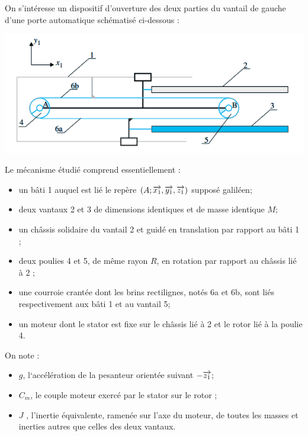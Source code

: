 \documentclass[10pt,fleqn]{article} %
\begin{document}
\def\pathfig{images}

\vspace{4.5cm}
\pagestyle{fancy}
\thispagestyle{plain}

\def\columnseprulecolor{\color{ocre}}
\setlength{\columnseprule}{0.4pt} 

\def\pathfig{images}

\ifprof
\else
\begin{multicols}{2}
\fi

On s’intéresse un dispositif d’ouverture des deux parties du vantail de gauche d’une porte automatique
schématisé ci-dessous :

\begin{center}
\includegraphics[width=\linewidth]{images/fig_01.png}
\end{center}

Le mécanisme étudié comprend essentiellement :
\begin{itemize}
\item un bâti 1 auquel est lié le repère $\left(A;\overrightarrow{x_1},\overrightarrow{y_1},\overrightarrow{z_1} \right)$ supposé galiléen;
\item deux vantaux 2 et 3 de dimensions identiques et de masse identique $M$;
\item un châssis solidaire du vantail 2 et guidé en translation par rapport au bâti 1 ;
\item deux poulies 4 et 5, de même rayon $R$, en rotation par rapport au châssis lié à 2 ;
\item une courroie crantée dont les brins rectilignes, notés 6a et 6b, sont liés respectivement aux bâti 1 et
au vantail 5;
\item un moteur dont le stator est fixe sur le châssis lié à 2 et le rotor lié à la poulie 4.
\end{itemize}

On note :
\begin{itemize}
\item $g$, l‘accélération de la pesanteur orientée suivant $-\overrightarrow{z_1}$;
\item $C_ m$, le couple moteur exercé par le stator sur le rotor ;
\item $J$ , l’inertie équivalente, ramenée sur l’axe du moteur, de toutes les masses et inerties autres que
celles des deux vantaux.
\end{itemize}


\end{multicols}
\end{document}
